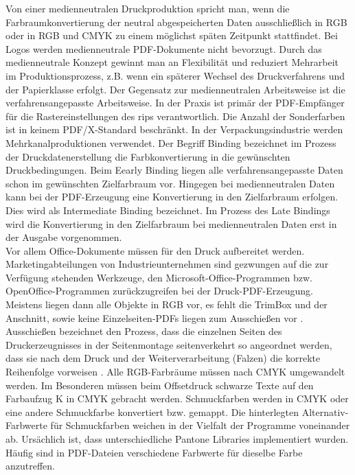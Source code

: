 Von einer medienneutralen Druckproduktion spricht man, wenn die Farbraumkonvertierung der neutral abgespeicherten Daten ausschließlich in RGB oder in RGB und CMYK zu einem möglichst späten Zeitpunkt stattfindet. Bei Logos werden medienneutrale PDF-Dokumente nicht bevorzugt. Durch das medienneutrale Konzept gewinnt man an Flexibilität und reduziert Mehrarbeit im Produktionsprozess, z.B. wenn ein späterer Wechsel des Druckverfahrens und der Papierklasse erfolgt. Der Gegensatz zur medienneutralen Arbeitsweise ist die verfahrensangepasste Arbeitsweise. In der Praxis ist primär der PDF-Empfänger für die Rastereinstellungen des \gls{rip}s verantwortlich. Die Anzahl der Sonderfarben ist in keinem PDF/X-Standard beschränkt. In der Verpackungsindustrie werden Mehrkanalproduktionen verwendet. Der Begriff Binding bezeichnet im Prozess der Druckdatenerstellung die Farbkonvertierung in die gewünschten Druckbedingungen. Beim Eearly Binding liegen alle verfahrensangepasste Daten schon im gewünschten Zielfarbraum vor. Hingegen bei medienneutralen Daten kann bei der PDF-Erzeugung eine Konvertierung in den Zielfarbraum erfolgen. Dies wird als Intermediate Binding bezeichnet. Im Prozess des Late Bindings wird die Konvertierung in den Zielfarbraum bei medienneutralen Daten erst in der Ausgabe vorgenommen. \\
Vor allem Office-Dokumente müssen für den Druck aufbereitet werden. Marketingabteilungen von Industrieunternehmen sind gezwungen auf die zur Verfügung stehenden Werkzeuge, den Microsoft-Office-Programmen bzw. OpenOffice-Programmen zurückzugreifen bei der Druck-PDF-Erzeugung. Meistens liegen dann alle Objekte in RGB vor, es fehlt die TrimBox und der Anschnitt, sowie keine Einzelseiten-PDFs liegen zum Ausschießen vor \cite{schneeberger}. Ausschießen bezeichnet den Prozess, dass die einzelnen Seiten des Druckerzeugnisses in der Seitenmontage seitenverkehrt so angeordnet werden, dass sie nach dem Druck und der Weiterverarbeitung (Falzen) die korrekte Reihenfolge vorweisen \cite{kompendium}. Alle RGB-Farbräume müssen nach CMYK umgewandelt werden. Im Besonderen müssen beim Offsetdruck schwarze Texte auf den Farbaufzug K in CMYK gebracht werden. Schmuckfarben werden in CMYK oder eine andere Schmuckfarbe konvertiert bzw. gemappt. Die hinterlegten Alternativ-Farbwerte für Schmuckfarben weichen in der Vielfalt der Programme voneinander ab. Ursächlich ist, dass unterschiedliche Pantone Libraries implementiert wurden. Häufig sind in PDF-Dateien verschiedene Farbwerte für dieselbe Farbe anzutreffen. \\
